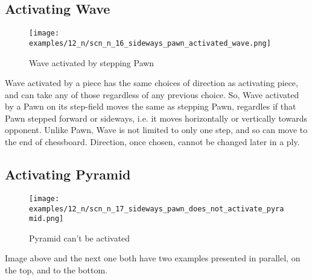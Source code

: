 \subsection*{Activating Wave}
\label{sec:Nineteen/Sideways Pawns/Activating Wave}

\vspace*{-1.4\baselineskip}
\noindent
\begin{figure}[!h]
\texttt{[image: examples/12\_n/scn\_n\_16\_sideways\_pawn\_activated\_wave.png]}
\vspace*{-1.4\baselineskip}
\caption{Wave activated by stepping Pawn}
\label{fig:scn_n_16_sideways_pawn_activated_wave}
\end{figure}

\vspace*{-0.5\baselineskip}
Wave activated by a piece has the same choices of direction as activating piece,
and can take any of those regardless of any previous choice. So, Wave activated
by a Pawn on its step-field moves the same as stepping Pawn, regardles if that
Pawn stepped forward or sideways, i.e. it moves horizontally or vertically
towards opponent. Unlike Pawn, Wave is not limited to only one step, and so
can move to the end of chessboard. Direction, once chosen, cannot be changed
later in a ply.

\clearpage %

\subsection*{Activating Pyramid}
\label{sec:Nineteen/Sideways Pawns/Activating Pyramid}

\vspace*{-1.4\baselineskip}
\noindent
\begin{figure}[!h]
\texttt{[image: examples/12\_n/scn\_n\_17\_sideways\_pawn\_does\_not\_activate\_pyramid.png]}
\vspace*{-1.3\baselineskip}
\caption{Pyramid can't be activated}
\label{fig:scn_n_17_sideways_pawn_does_not_activate_pyramid}
\end{figure}

\vspace*{-0.3\baselineskip}
Image above and the next one both have two examples presented in parallel, on the
top, and to the bottom.

